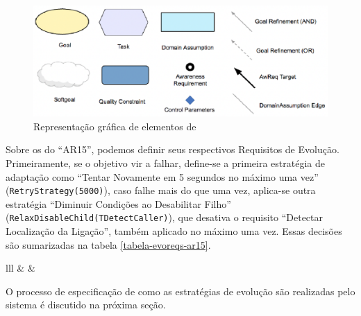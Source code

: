 \begin{figure}[h]
	\centering
	\includegraphics[width=1\textwidth]{figuras/modelos/Elementos-GORE.png}
	\caption{Representação gráfica de elementos de \gore}
	\label{figura-elementos-gore-eca}
\end{figure}

Sobre os \evoreqs do ``AR15'', podemos definir seus respectivos Requisitos de Evolução. Primeiramente, se o objetivo vir a falhar, define-se a primeira estratégia de adaptação como ``Tentar Novamente em 5 segundos no máximo uma vez'' (\texttt{RetryStrategy(5000)}), caso falhe mais do que uma vez, aplica-se outra estratégia ``Diminuir Condições ao Desabilitar Filho'' (\texttt{RelaxDisableChild(TDetectCaller)}), que desativa o requisito ``Detectar Localização da Ligação'', também aplicado no máximo uma vez. Essas decisões são sumarizadas na tabela \ref{tabela-evoreqs-ar15}.

\begin{table}[]
	\centering
	\caption{Tabela de especificação das estratégias de adaptação de AR15.}
	\label{tabela-evoreqs-ar15}
	\begin{tabular}{lll}
		\cline{1-3}
		 &  &  
	\end{tabular}
\end{table}

O processo de especificação de como as estratégias de evolução são realizadas pelo sistema é discutido na próxima seção.



